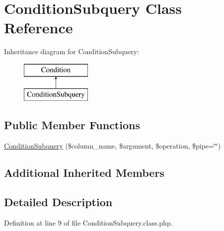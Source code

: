 \hypertarget{classConditionSubquery}{\section{Condition\+Subquery Class Reference}
\label{classConditionSubquery}
}
Inheritance diagram for Condition\+Subquery\+:\begin{figure}[H]
\begin{center}
\leavevmode
\includegraphics[height=2.000000cm]{classConditionSubquery}
\end{center}
\end{figure}
\subsection*{Public Member Functions}
\begin{DoxyCompactItemize}
\item 
\hyperlink{classConditionSubquery_a5dd42cd7316837c2b63fe9b6d5703958}{Condition\+Subquery} (\$column\+\_\+name, \$argument, \$operation, \$pipe=\char`\"{}\char`\"{})
\end{DoxyCompactItemize}
\subsection*{Additional Inherited Members}


\subsection{Detailed Description}


Definition at line 9 of file Condition\+Subquery.\+class.\+php.



